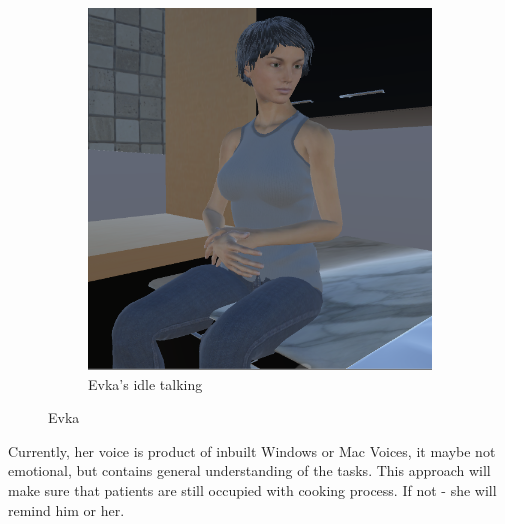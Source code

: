 \documentclass[18pt]{article}
\numberwithin{equation}{section} %
\numberwithin{figure}{section} %
\numberwithin{table}{section} %
\begin{document}
\begin{figure}[H]
\begin{subfigure}{0.4\textwidth}
			\includegraphics[width=0.96\linewidth]{images/Evka_sit_2}
			\caption{Evka's idle talking}
		\end{subfigure}		
		\caption{Evka}
		\label{fig:evkasit1}
	\end{figure}
	
	
	Currently, her voice is product of inbuilt Windows or Mac Voices, it maybe not emotional, but contains general understanding of the tasks. This approach will make sure that patients are still occupied with cooking process. If not - she will remind him or her. \\	
	
\end{document}
